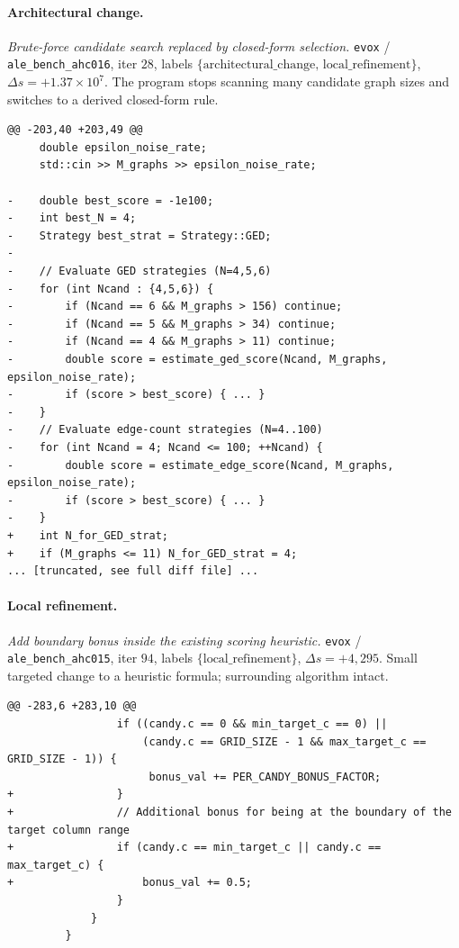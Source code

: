 \paragraph{Architectural change.}
\textit{Brute-force candidate search replaced by closed-form selection.} \texttt{evox} / \texttt{ale\_bench\_ahc016}, iter $28$, labels $\{\text{architectural\_change},\,\text{local\_refinement}\}$, $\Delta s = +1.37 \times 10^{7}$. The program stops scanning many candidate graph sizes and switches to a derived closed-form rule.
{\scriptsize
\begin{verbatim}
@@ -203,40 +203,49 @@
     double epsilon_noise_rate;
     std::cin >> M_graphs >> epsilon_noise_rate;

-    double best_score = -1e100;
-    int best_N = 4;
-    Strategy best_strat = Strategy::GED;
-
-    // Evaluate GED strategies (N=4,5,6)
-    for (int Ncand : {4,5,6}) {
-        if (Ncand == 6 && M_graphs > 156) continue;
-        if (Ncand == 5 && M_graphs > 34) continue;
-        if (Ncand == 4 && M_graphs > 11) continue;
-        double score = estimate_ged_score(Ncand, M_graphs, epsilon_noise_rate);
-        if (score > best_score) { ... }
-    }
-    // Evaluate edge-count strategies (N=4..100)
-    for (int Ncand = 4; Ncand <= 100; ++Ncand) {
-        double score = estimate_edge_score(Ncand, M_graphs, epsilon_noise_rate);
-        if (score > best_score) { ... }
-    }
+    int N_for_GED_strat;
+    if (M_graphs <= 11) N_for_GED_strat = 4;
... [truncated, see full diff file] ...
\end{verbatim}
}

\paragraph{Local refinement.}
\textit{Add boundary bonus inside the existing scoring heuristic.} \texttt{evox} / \texttt{ale\_bench\_ahc015}, iter $94$, labels $\{\text{local\_refinement}\}$, $\Delta s = +4{,}295$. Small targeted change to a heuristic formula; surrounding algorithm intact.
{\scriptsize
\begin{verbatim}
@@ -283,6 +283,10 @@
                 if ((candy.c == 0 && min_target_c == 0) ||
                     (candy.c == GRID_SIZE - 1 && max_target_c == GRID_SIZE - 1)) {
                      bonus_val += PER_CANDY_BONUS_FACTOR;
+                }
+                // Additional bonus for being at the boundary of the target column range
+                if (candy.c == min_target_c || candy.c == max_target_c) {
+                    bonus_val += 0.5;
                 }
             }
         }
\end{verbatim}
}

